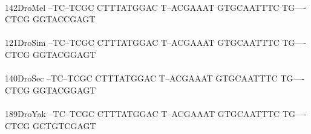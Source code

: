 \documentclass[11pt,twoside,reqno,a4paper]{article}
\begin{document}
{\\
142\hspace*{1\charwidth}DroMel	--TC--TCGC	CTTTATGGAC	T--ACGAAAT	GTGCAATTTC	TG----CTCG	GGTACCGAGT	\\
\hspace*{4\charwidth}\hspace*{7\charwidth}\hspace*{1\charwidth}\hspace*{1\charwidth}\hspace*{1\charwidth}\hspace*{1\charwidth}\hspace*{1\charwidth}\hspace*{1\charwidth}\\
121\hspace*{1\charwidth}DroSim	--TC--TCGC	CTTTATGGAC	T--ACGAAAT	GTGCAATTTC	TG----CTCG	GGTACGGAGT	\\
\hspace*{4\charwidth}\hspace*{7\charwidth}\hspace*{1\charwidth}\hspace*{1\charwidth}\hspace*{1\charwidth}\hspace*{1\charwidth}\hspace*{1\charwidth}\hspace*{1\charwidth}\\
140\hspace*{1\charwidth}DroSec	--TC--TCGC	CTTTATGGAC	T--ACGAAAT	GTGCAATTTC	TG----CTCG	GGTACGGAGT	\\
\hspace*{4\charwidth}\hspace*{7\charwidth}\hspace*{1\charwidth}\hspace*{1\charwidth}\hspace*{1\charwidth}\hspace*{1\charwidth}\hspace*{1\charwidth}\hspace*{1\charwidth}\\
189\hspace*{1\charwidth}DroYak	--TC--TCGC	CTTTATGGAC	T--ACGAAAT	GTGCAATTTC	TG----CTCG	GCTGTCGAGT	\\
\hspace*{4\charwidth}\hspace*{7\charwidth}\hspace*{1\charwidth}\hspace*{1\charwidth}\hspace*{1\charwidth}\hspace*{1\charwidth}\hspace*{1\charwidth}\hspace*{1\charwidth}\\
}
\end{document}
